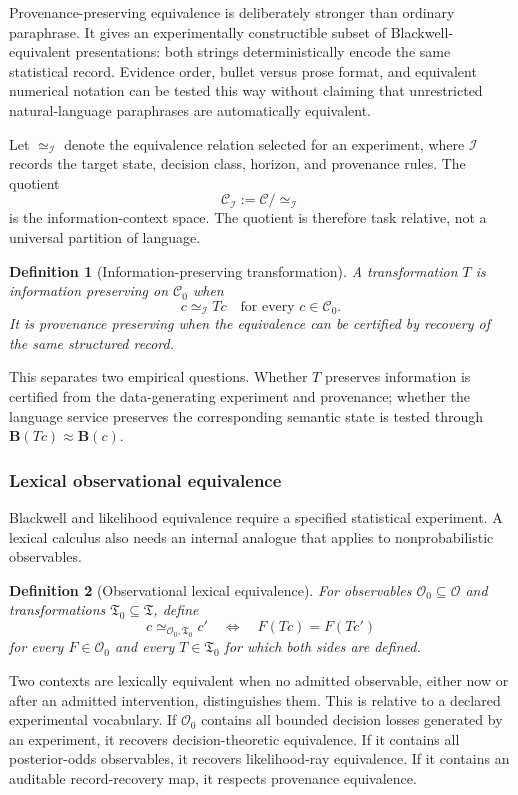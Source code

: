 \documentclass[11pt]{article}
\newtheorem{definition}{Definition}[section]
\newcommand{\Ctxt}{\mathcal C}
\newcommand{\Trans}{\mathfrak T}
\newcommand{\Bmap}{\mathbf B}
\begin{document}
Provenance-preserving equivalence is deliberately stronger than ordinary paraphrase. It gives an experimentally constructible subset of Blackwell-equivalent presentations: both strings deterministically encode the same statistical record. Evidence order, bullet versus prose format, and equivalent numerical notation can be tested this way without claiming that unrestricted natural-language paraphrases are automatically equivalent.

Let $\simeq_{\mathcal I}$ denote the equivalence relation selected for an experiment, where $\mathcal I$ records the target state, decision class, horizon, and provenance rules. The quotient
\[
 \Ctxt_{\mathcal I}:=\Ctxt/{\simeq_{\mathcal I}}
\]
is the information-context space. The quotient is therefore task relative, not a universal partition of language.

\begin{definition}[Information-preserving transformation]
A transformation $T$ is information preserving on $\Ctxt_0$ when
\[
 c\simeq_{\mathcal I}Tc
\quad\text{for every }c\in\Ctxt_0.
\]
It is provenance preserving when the equivalence can be certified by recovery of the same structured record.
\end{definition}

This separates two empirical questions. Whether $T$ preserves information is certified from the data-generating experiment and provenance; whether the language service preserves the corresponding semantic state is tested through $\Bmap(Tc)\approx\Bmap(c)$.

\subsubsection{Lexical observational equivalence}

Blackwell and likelihood equivalence require a specified statistical experiment. A lexical calculus also needs an internal analogue that applies to nonprobabilistic observables.

\begin{definition}[Observational lexical equivalence]\label{def:lexequiv}
For observables $\mathcal O_0\subseteq\mathcal O$ and transformations $\Trans_0\subseteq\Trans$, define
\[
 c\simeq_{\mathcal O_0,\Trans_0}c'
 \quad\Longleftrightarrow\quad
 F(Tc)=F(Tc')
\]
for every $F\in\mathcal O_0$ and every $T\in\Trans_0$ for which both sides are defined.
\end{definition}

Two contexts are lexically equivalent when no admitted observable, either now or after an admitted intervention, distinguishes them. This is relative to a declared experimental vocabulary. If $\mathcal O_0$ contains all bounded decision losses generated by an experiment, it recovers decision-theoretic equivalence. If it contains all posterior-odds observables, it recovers likelihood-ray equivalence. If it contains an auditable record-recovery map, it respects provenance equivalence.
\end{document}
